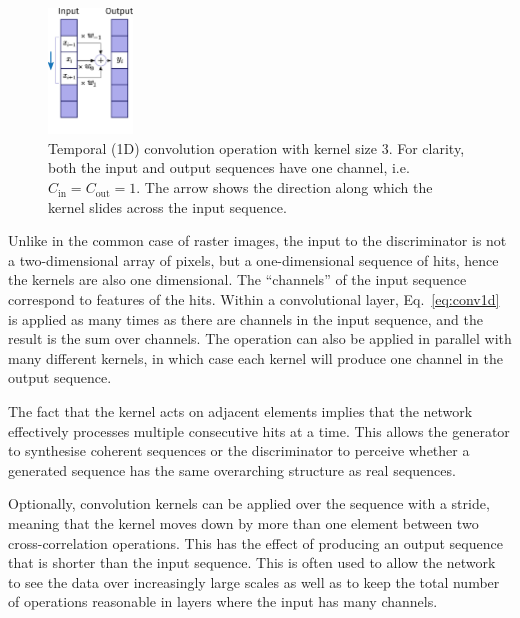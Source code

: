 \begin{figure}
    \centering
    \includegraphics[width=0.20\textwidth]{chapter4/1d_convolution.pdf}
    \caption{Temporal (1D) convolution operation with kernel size 3. For clarity, both the input and output sequences have one channel, i.e.\  $C_\mathrm{in} = C_\mathrm{out} = 1$. The arrow shows the direction along which the kernel slides across the input sequence.}
    \label{fig:temporal_conv}
\end{figure}


Unlike in the common case of raster images, the input to the discriminator is not a two-dimensional array of pixels, but a one-dimensional sequence of hits, hence the kernels are also one dimensional. The ``channels'' of the input sequence correspond to features of the hits. Within a convolutional layer, Eq.~\ref{eq:conv1d} is applied as many times as there are channels in the input sequence, and the result is the sum over channels. 
The operation can also be applied in parallel with many different kernels, in which case each kernel will produce one channel in the output sequence.


The fact that the kernel acts on adjacent elements implies that the network effectively processes multiple consecutive hits at a time. This allows the generator to synthesise coherent sequences or the discriminator to perceive whether a generated sequence has the same overarching structure as real sequences.

Optionally, convolution kernels can be applied over the sequence with a stride, meaning that the kernel moves down by more than one element between two cross-correlation operations.
This has the effect of producing an output sequence that is shorter than the input sequence. This is often used to allow the network to see the data over increasingly large scales as well as to keep the total number of operations reasonable in layers where the input has many channels.

